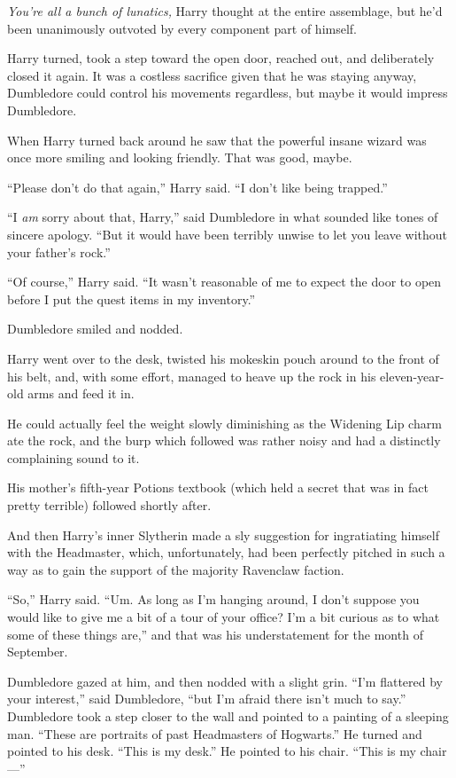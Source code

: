 \emph{You’re all a bunch of lunatics,} Harry thought at the entire assemblage, but he’d been unanimously outvoted by every component part of himself.

Harry turned, took a step toward the open door, reached out, and deliberately closed it again. It was a costless sacrifice given that he was staying anyway, Dumbledore could control his movements regardless, but maybe it would impress Dumbledore.

When Harry turned back around he saw that the powerful insane wizard was once more smiling and looking friendly. That was good, maybe.

“Please don’t do that again,” Harry said. “I don’t like being trapped.”

“I \emph{am} sorry about that, Harry,” said Dumbledore in what sounded like tones of sincere apology. “But it would have been terribly unwise to let you leave without your father’s rock.”

“Of course,” Harry said. “It wasn’t reasonable of me to expect the door to open before I put the quest items in my inventory.”

Dumbledore smiled and nodded.

Harry went over to the desk, twisted his mokeskin pouch around to the front of his belt, and, with some effort, managed to heave up the rock in his eleven-year-old arms and feed it in.

He could actually feel the weight slowly diminishing as the Widening Lip charm ate the rock, and the burp which followed was rather noisy and had a distinctly complaining sound to it.

His mother’s fifth-year Potions textbook (which held a secret that was in fact pretty terrible) followed shortly after.

And then Harry’s inner Slytherin made a sly suggestion for ingratiating himself with the Headmaster, which, unfortunately, had been perfectly pitched in such a way as to gain the support of the majority Ravenclaw faction.

“So,” Harry said. “Um. As long as I’m hanging around, I don’t suppose you would like to give me a bit of a tour of your office? I’m a bit curious as to what some of these things are,” and that was his understatement for the month of September.

Dumbledore gazed at him, and then nodded with a slight grin. “I’m flattered by your interest,” said Dumbledore, “but I’m afraid there isn’t much to say.” Dumbledore took a step closer to the wall and pointed to a painting of a sleeping man. “These are portraits of past Headmasters of Hogwarts.” He turned and pointed to his desk. “This is my desk.” He pointed to his chair. “This is my chair—”

